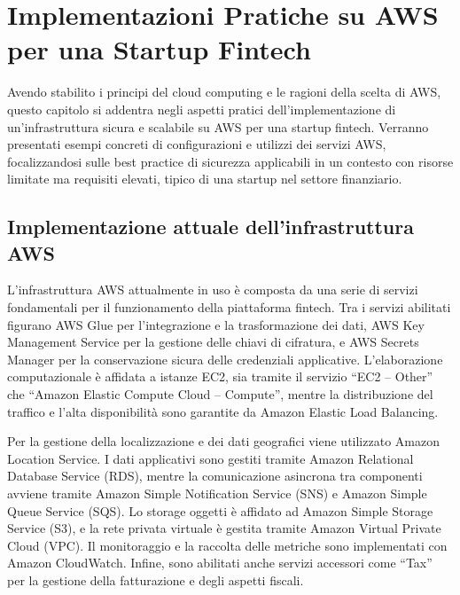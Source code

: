 \documentclass[a4paper,12pt]{report}
\begin{document}
\chapter{Implementazioni Pratiche su AWS per una Startup Fintech}
\label{ch:implementazioni-pratiche}

Avendo stabilito i principi del cloud computing e le ragioni della scelta di AWS, questo capitolo si addentra negli aspetti pratici dell'implementazione di un'infrastruttura sicura e scalabile su AWS per una startup fintech. Verranno presentati esempi concreti di configurazioni e utilizzi dei servizi AWS, focalizzandosi sulle best practice di sicurezza applicabili in un contesto con risorse limitate ma requisiti elevati, tipico di una startup nel settore finanziario.

\section{Implementazione attuale dell'infrastruttura AWS} 
L'infrastruttura AWS attualmente in uso è composta da una serie di servizi fondamentali per il funzionamento della piattaforma fintech. Tra i servizi abilitati figurano AWS Glue per l'integrazione e la trasformazione dei dati, AWS Key Management Service per la gestione delle chiavi di cifratura, e AWS Secrets Manager per la conservazione sicura delle credenziali applicative. L’elaborazione computazionale è affidata a istanze EC2, sia tramite il servizio “EC2 – Other” che “Amazon Elastic Compute Cloud – Compute”, mentre la distribuzione del traffico e l'alta disponibilità sono garantite da Amazon Elastic Load Balancing.

Per la gestione della localizzazione e dei dati geografici viene utilizzato Amazon Location Service. I dati applicativi sono gestiti tramite Amazon Relational Database Service (RDS), mentre la comunicazione asincrona tra componenti avviene tramite Amazon Simple Notification Service (SNS) e Amazon Simple Queue Service (SQS). Lo storage oggetti è affidato ad Amazon Simple Storage Service (S3), e la rete privata virtuale è gestita tramite Amazon Virtual Private Cloud (VPC). Il monitoraggio e la raccolta delle metriche sono implementati con Amazon CloudWatch. Infine, sono abilitati anche servizi accessori come “Tax” per la gestione della fatturazione e degli aspetti fiscali.
\end{document}
